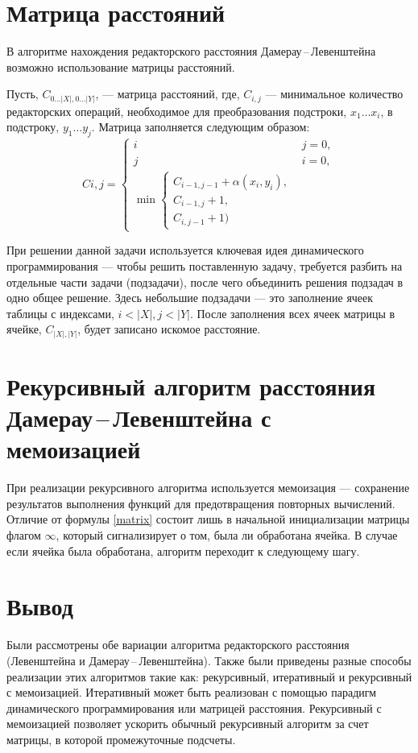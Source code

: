 \section{Матрица расстояний}
В алгоритме нахождения редакторского расстояния Дамерау\,--\,Левенштейна возможно использование матрицы расстояний.

Пусть, $C_{0 \dots |X|, 0 \dots |Y|}$, --- матрица расстояний, где, $C_{i, j}$ --- минимальное количество редакторских операций, необходимое для преобразования подстроки, $x_1\dots x_i$, в подстроку, $y_1 \dots y_j$. Матрица заполняется следующим образом:
\begin{equation}\label{matrix}
	C{i, j} = 
	\begin{cases}
		i & j = 0, \\
		j & i = 0, \\
		\min 
		\begin{cases}
			C_{i - 1, j - 1} + \alpha(x_i, y_i), \\
			C_{i - 1, j} + 1, \\
			C_{i, j - 1} + 1)
		\end{cases}
	\end{cases}
\end{equation}

При решении данной задачи используется ключевая идея динамического программирования --- чтобы решить поставленную задачу, требуется разбить на отдельные части задачи (подзадачи), после чего объединить решения подзадач в одно общее решение. Здесь небольшие подзадачи --- это заполнение ячеек таблицы с индексами, $i < |X|, j < |Y|$. После заполнения всех ячеек матрицы в ячейке, $C_{|X|, |Y|}$, будет записано искомое расстояние.



\section{Рекурсивный алгоритм расстояния Дамерау\,--\,Левенштейна с мемоизацией}
При реализации рекурсивного алгоритма используется мемоизация --- сохранение результатов выполнения функций для предотвращения повторных вычислений. Отличие от формулы \ref{matrix} состоит лишь в начальной инициализации матрицы флагом $\infty$, который сигнализирует о том, была ли обработана ячейка. В случае если ячейка была обработана, алгоритм переходит к следующему шагу. 


\section{Вывод}
Были рассмотрены обе вариации алгоритма редакторского расстояния (Левенштейна и Дамерау\,--\,Левенштейна). Также были приведены разные способы реализации этих алгоритмов такие как: рекурсивный, итеративный и рекурсивный с мемоизацией. Итеративный может быть реализован с помощью парадигм динамического программирования или матрицей расстояния. Рекурсивный с мемоизацией позволяет ускорить обычный рекурсивный алгоритм за счет матрицы, в которой промежуточные подсчеты.